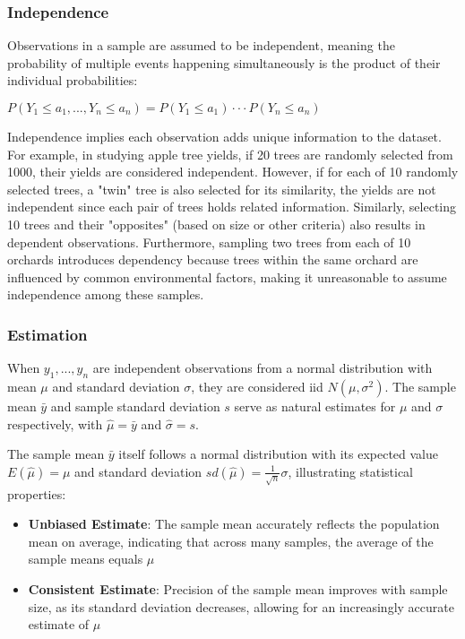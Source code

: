 \documentclass{article}
\begin{document}
\subsubsection{Independence}

Observations in a sample are assumed to be independent, meaning the probability of multiple events happening simultaneously is the product of their individual probabilities:

$P(Y_1 \leq a_1, ..., Y_n \leq a_n) = P(Y_1 \leq a_1) \cdot \cdot \cdot P(Y_n \leq a_n)$

Independence implies each observation adds unique information to the dataset. For example, in studying apple tree yields, if 20 trees are randomly selected from 1000, their yields are considered independent. However, if for each of 10 randomly selected trees, a "twin" tree is also selected for its similarity, the yields are not independent since each pair of trees holds related information. Similarly, selecting 10 trees and their "opposites" (based on size or other criteria) also results in dependent observations. Furthermore, sampling two trees from each of 10 orchards introduces dependency because trees within the same orchard are influenced by common environmental factors, making it unreasonable to assume independence among these samples.

\subsubsection{Estimation}

When $y_1, ..., y_n$ are independent observations from a normal distribution with mean $\mu$ and standard deviation $\sigma$, they are considered iid $N(\mu, \sigma^2)$. The sample mean $\bar y$ and sample standard deviation $s$ serve as natural estimates for $\mu$ and $\sigma$ respectively, with $\hat \mu = \bar y$ and $\hat \sigma = s$.

The sample mean $\bar y$ itself follows a normal distribution with its expected value $E(\hat \mu) = \mu$ and standard deviation $sd(\hat \mu) = \frac {1} {\sqrt{n}} \sigma$, illustrating statistical properties:

\begin{itemize}
    \item \textbf{Unbiased Estimate}: The sample mean accurately reflects the population mean on average, indicating that across many samples, the average of the sample means equals $\mu$
    \item \textbf{Consistent Estimate}: Precision of the sample mean improves with sample size, as its standard deviation decreases, allowing for an increasingly accurate estimate of $\mu$
\end{itemize}
\end{document}
